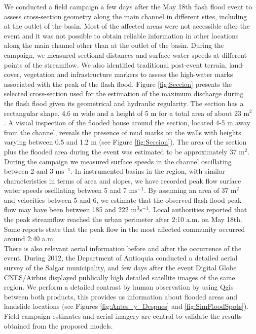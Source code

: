\documentclass[hess, manuscript]{copernicus}
\begin{document}
We conducted a field campaign a few days after the May 18th flash flood event to assess cross-section geometry along the main channel in different sites, including at the outlet of the basin. Most of the affected areas were not accessible after the event and it was not  possible to obtain reliable information in other locations along the main channel other than at the outlet of the basin. During the campaign, we measured sectional distances and surface water speeds at different points of the streamflow. We also identified traditional post-event terrain, land-cover, vegetation and infrastructure markers to assess the high-water marks associated with the peak of the flash flood.  Figure \ref{fig:Seccion} presents the selected cross-section used for the estimation of the maximum discharge during the flash flood given its geometrical and hydraulic regularity. The section has a rectangular shape,  4.6 $\text{m}$ wide and a height of 5 $\text{m}$ for a total area of about 23 $\text{m}^2$. A visual inspection of the flooded house around the section,   located 4-5 $\text{m}$ away from the channel, reveals the presence of mud marks on the walls with heights varying between 0.5 and 1.2 $\text{m}$ (see Figure \ref{fig:Seccion}). The area of the section plus the flooded area during the event was estimated to be approximately 37 $\text{m}^2$.  During the campaign we measured surface speeds in the channel oscillating between 2 and 3 $\text{ms}^{-1}$.   In instrumented basins in the region, with similar characteristics in terms of area and slopes,  we have recorded peak flow surface water speeds oscillating between 5 and 7 $\text{ms}^{-1}$.  By assuming an area of 37 $\text{m}^2$ and velocities between 5 and 6,  we estimate that the observed flash flood peak flow may have been between 185 and 222 $\text{m}^3\text{s}^{-1}$. Local authorities reported that the peak streamflow reached the urban perimeter after 2:10 a.m. on May 18th. Some reports state that the peak flow in the most affected community occurred around 2:40 a.m.\\

There is also relevant aerial information before and after the occurrence of the event.  During 2012, the Department of Antioquia conducted a detailed aerial survey of the Salgar municipality, and few days after the event Digital Globe CNES/Airbus displayed publically high detailed satellite images of the same region.  We perform a detailed contrast by human observation by using Qgis between both products, this provides us information about flooded areas and landslide locations (see Figures \ref{fig:Antes_y_Despues} and \ref{fig:SimFloodSpots}).   Field campaign estimates and aerial imagery are central to validate the results obtained from the proposed models.\\
\end{document}
